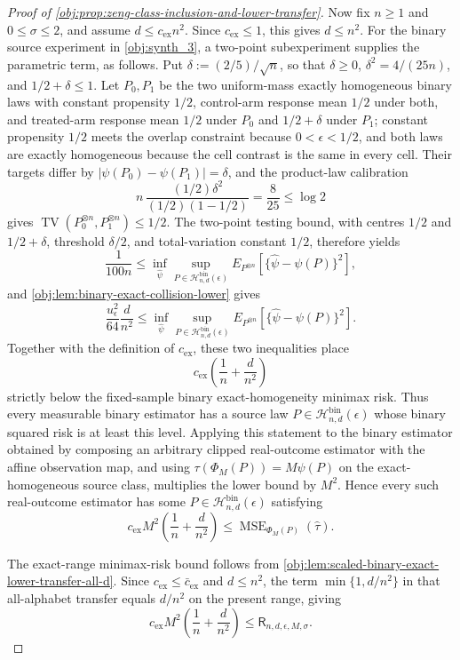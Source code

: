 \begin{proof}[Proof of \cref{obj:prop:zeng-class-inclusion-and-lower-transfer}]
Now fix \(n\ge1\) and \(0\le\sigma\le2\), and assume \(d\le c_{\mathrm{ex}}n^2\).  Since \(c_{\mathrm{ex}}\le1\), this gives \(d\le n^2\).  For the binary source experiment in \cref{obj:synth_3}, a two-point subexperiment supplies the parametric term, as follows.  Put \(\delta:=(2/5)/\sqrt n\), so that \(\delta\ge0\), \(\delta^2=4/(25n)\), and \(1/2+\delta\le1\).  Let \(P_0,P_1\) be the two uniform-mass exactly homogeneous binary laws with constant propensity \(1/2\), control-arm response mean \(1/2\) under both, and treated-arm response mean \(1/2\) under \(P_0\) and \(1/2+\delta\) under \(P_1\); constant propensity \(1/2\) meets the overlap constraint because \(0<\epsilon<1/2\), and both laws are exactly homogeneous because the cell contrast is the same in every cell.  Their targets differ by \(|\psi(P_0)-\psi(P_1)|=\delta\), and the product-law calibration
\[
n\,\frac{(1/2)\delta^2}{(1/2)(1-1/2)}
=
\frac{8}{25}
\le\log 2
\]
gives \(\operatorname{TV}(P_0^{\otimes n},P_1^{\otimes n})\le1/2\).  The two-point testing bound, with centres \(1/2\) and \(1/2+\delta\), threshold \(\delta/2\), and total-variation constant \(1/2\), therefore yields
\[
\frac1{100n}
\le
\inf_{\widehat\psi}\sup_{P\in\mathcal H_{n,d}^{\mathrm{bin}}(\epsilon)}
E_{P^{\otimes n}}\!\left[\{\widehat\psi-\psi(P)\}^2\right],
\]
and \cref{obj:lem:binary-exact-collision-lower} gives
\[
\frac{u_{\epsilon}^2}{64}\frac d{n^2}
\le
\inf_{\widehat\psi}\sup_{P\in\mathcal H_{n,d}^{\mathrm{bin}}(\epsilon)}
E_{P^{\otimes n}}\!\left[\{\widehat\psi-\psi(P)\}^2\right].
\]
Together with the definition of \(c_{\mathrm{ex}}\), these two inequalities place
\[
c_{\mathrm{ex}}\left(\frac1n+\frac d{n^2}\right)
\]
strictly below the fixed-sample binary exact-homogeneity minimax risk.  Thus every measurable binary estimator has a source law \(P\in\mathcal H_{n,d}^{\mathrm{bin}}(\epsilon)\) whose binary squared risk is at least this level.  Applying this statement to the binary estimator obtained by composing an arbitrary clipped real-outcome estimator with the affine observation map, and using \(\tau(\Phi_M(P))=M\psi(P)\) on the exact-homogeneous source class, multiplies the lower bound by \(M^2\).  Hence every such real-outcome estimator has some \(P\in\mathcal H_{n,d}^{\mathrm{bin}}(\epsilon)\) satisfying
\[
c_{\mathrm{ex}}M^2\left(\frac1n+\frac d{n^2}\right)
\le
\operatorname{MSE}_{\Phi_M(P)}(\widehat\tau).
\]

The exact-range minimax-risk bound follows from \cref{obj:lem:scaled-binary-exact-lower-transfer-all-d}.  Since \(c_{\mathrm{ex}}\le\bar c_{\mathrm{ex}}\) and \(d\le n^2\), the term \(\min\{1,d/n^2\}\) in that all-alphabet transfer equals \(d/n^2\) on the present range, giving
\[
c_{\mathrm{ex}}M^2\left(\frac1n+\frac d{n^2}\right)
\le
\mathsf R_{n,d,\epsilon,M,\sigma}.
\]


\end{proof}
